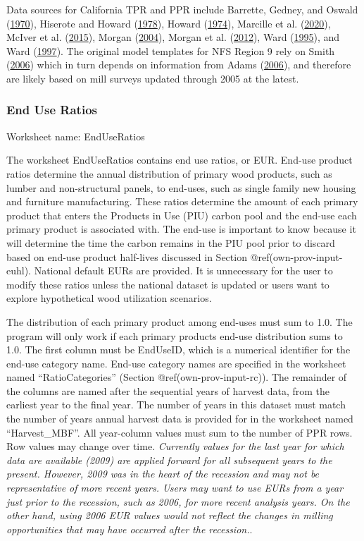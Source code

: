 \documentclass[
  openany]{book}
\begin{document}
Data sources for California TPR and PPR include Barrette, Gedney, and
Oswald (\protect\hyperlink{ref-barrette1970}{1970}), Hiserote and Howard
(\protect\hyperlink{ref-hiserote1978}{1978}), Howard
(\protect\hyperlink{ref-howard1974}{1974}), Marcille et al.
(\protect\hyperlink{ref-marcille2020}{2020}), McIver et al.
(\protect\hyperlink{ref-mciver2015}{2015}), Morgan
(\protect\hyperlink{ref-morgan2004}{2004}), Morgan et al.
(\protect\hyperlink{ref-morgan2012}{2012}), Ward
(\protect\hyperlink{ref-ward1995}{1995}), and Ward
(\protect\hyperlink{ref-ward1997}{1997}). The original model templates
for NFS Region 9 rely on Smith (\protect\hyperlink{ref-smith2006}{2006})
which in turn depends on information from Adams
(\protect\hyperlink{ref-adams2006}{2006}), and therefore are likely
based on mill surveys updated through 2005 at the latest.

\hypertarget{own-prov-input-eur}{%
\subsubsection{End Use Ratios}\label{own-prov-input-eur}}

Worksheet name: EndUseRatios

The worksheet EndUseRatios contains end use ratios, or EUR. End-use
product ratios determine the annual distribution of primary wood
products, such as lumber and non-structural panels, to end-uses, such as
single family new housing and furniture manufacturing. These ratios
determine the amount of each primary product that enters the Products in
Use (PIU) carbon pool and the end-use each primary product is associated
with. The end-use is important to know because it will determine the
time the carbon remains in the PIU pool prior to discard based on
end-use product half-lives discussed in Section
@ref(own-prov-input-euhl). National default EURs are provided. It is
unnecessary for the user to modify these ratios unless the national
dataset is updated or users want to explore hypothetical wood
utilization scenarios.

The distribution of each primary product among end-uses must sum to 1.0.
The program will only work if each primary products end-use distribution
sums to 1.0. The first column must be EndUseID, which is a numerical
identifier for the end-use category name. End-use category names are
specified in the worksheet named ``RatioCategories'' (Section
@ref(own-prov-input-rc)). The remainder of the columns are named after
the sequential years of harvest data, from the earliest year to the
final year. The number of years in this dataset must match the number of
years annual harvest data is provided for in the worksheet named
``Harvest\_MBF''. All year-column values must sum to the number of PPR
rows. Row values may change over time. \emph{Currently values for the
last year for which data are available (2009) are applied forward for
all subsequent years to the present. However, 2009 was in the heart of
the recession and may not be representative of more recent years. Users
may want to use EURs from a year just prior to the recession, such as
2006, for more recent analysis years. On the other hand, using 2006 EUR
values would not reflect the changes in milling opportunities that may
have occurred after the recession.}.
\end{document}
